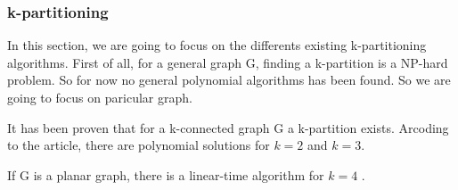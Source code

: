 \subsubsection{k-partitioning}
In this section, we are going to focus on the differents existing k-partitioning algorithms.
First of all, for a general graph G, finding a k-partition is a NP-hard problem\cite{Dyer1985139}.
So for now no general polynomial algorithms has been found.
So we are going to focus on paricular graph.

It has been proven that for a k-connected graph G a k-partition exists\cite{GE78,LL77}.
Arcoding to the article, there are polynomial solutions for $k=2$\cite{GE78,LL77} and $k=3$.

If G is a planar graph, there is a linear-time algorithm for $k = 4$ \cite{Nakano1997315}.




